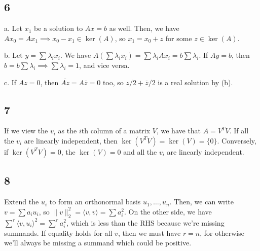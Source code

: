 \documentclass{article}
\newcommand{\conj}{\overline}
\begin{document}
\subsection*{6}
a. Let $x_1$ be a solution to $Ax=b$ as well. Then, we have $Ax_0=Ax_1\implies x_0-x_1\in\ker(A)$, so $x_1=x_0+z$ for some $z\in\ker(A)$.

\noindent b. Let $y=\sum\lambda_ix_i$. We have $A(\sum\lambda_ix_i)=\sum\lambda_iAx_i=b\sum\lambda_i$. If $Ay=b$, then $b=b\sum\lambda_i\implies\sum\lambda_i=1$, and vice versa.

\noindent c. If $Az=0$, then $\conj{Az}=A\conj{z}=0$ too, so $z/2+\conj{z}/2$ is a real solution by (b).

\subsection*{7}
If we view the $v_i$ as the $i$th column of a matrix $V$, we have that $A=V^TV$. If all the $v_i$ are linearly independent, then $\ker(V^TV)=\ker(V)=\{0\}$. Conversely, if $\ker(V^TV)=0$, the $\ker(V)=0$ and all the $v_i$ are linearly independent.

\subsection*{8}
Extend the $u_i$ to form an orthonormal basis $u_1,\ldots,u_n$. Then, we can write $v=\sum a_iu_i$, so $\lVert v\rVert_2^2=\langle v,v\rangle=\sum a_i^2$. On the other side, we have $\sum^r\langle v,u_i\rangle^2=\sum^ra_i^2$, which is less than the RHS because we're missing summands. If equality holds for all $v$, then we must have $r=n$, for otherwise we'll always be missing a summand which could be positive.
\end{document}
